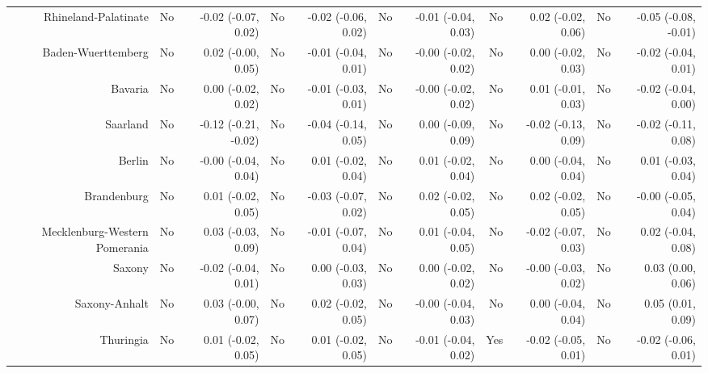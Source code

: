 \documentclass[
  man,floatsintext]{apa6}
\newenvironment{lltable}{\begin{landscape}\centering\begin{ThreePartTable}}{\end{ThreePartTable}\end{landscape}}
\begin{document}
\begin{lltable}
{\begin{longtable}{rrrrrrrrrrr}
Rhineland-Palatinate & No & -0.02 (-0.07, 0.02) & No & -0.02 (-0.06, 0.02) & No & -0.01 (-0.04, 0.03) & No & 0.02 (-0.02, 0.06) & No & -0.05 (-0.08, -0.01)\\
Baden-Wuerttemberg & No & 0.02 (-0.00, 0.05) & No & -0.01 (-0.04, 0.01) & No & -0.00 (-0.02, 0.02) & No & 0.00 (-0.02, 0.03) & No & -0.02 (-0.04, 0.01)\\
Bavaria & No & 0.00 (-0.02, 0.02) & No & -0.01 (-0.03, 0.01) & No & -0.00 (-0.02, 0.02) & No & 0.01 (-0.01, 0.03) & No & -0.02 (-0.04, 0.00)\\
Saarland & No & -0.12 (-0.21, -0.02) & No & -0.04 (-0.14, 0.05) & No & 0.00 (-0.09, 0.09) & No & -0.02 (-0.13, 0.09) & No & -0.02 (-0.11, 0.08)\\
Berlin & No & -0.00 (-0.04, 0.04) & No & 0.01 (-0.02, 0.04) & No & 0.01 (-0.02, 0.04) & No & 0.00 (-0.04, 0.04) & No & 0.01 (-0.03, 0.04)\\
Brandenburg & No & 0.01 (-0.02, 0.05) & No & -0.03 (-0.07, 0.02) & No & 0.02 (-0.02, 0.05) & No & 0.02 (-0.02, 0.05) & No & -0.00 (-0.05, 0.04)\\
Mecklenburg-Western Pomerania & No & 0.03 (-0.03, 0.09) & No & -0.01 (-0.07, 0.04) & No & 0.01 (-0.04, 0.05) & No & -0.02 (-0.07, 0.03) & No & 0.02 (-0.04, 0.08)\\
Saxony & No & -0.02 (-0.04, 0.01) & No & 0.00 (-0.03, 0.03) & No & 0.00 (-0.02, 0.02) & No & -0.00 (-0.03, 0.02) & No & 0.03 (0.00, 0.06)\\
Saxony-Anhalt & No & 0.03 (-0.00, 0.07) & No & 0.02 (-0.02, 0.05) & No & -0.00 (-0.04, 0.03) & No & 0.00 (-0.04, 0.04) & No & 0.05 (0.01, 0.09)\\
Thuringia & No & 0.01 (-0.02, 0.05) & No & 0.01 (-0.02, 0.05) & No & -0.01 (-0.04, 0.02) & Yes & -0.02 (-0.05, 0.01) & No & -0.02 (-0.06, 0.01)\\
\bottomrule
\end{longtable}

}

\end{lltable}
\end{document}
